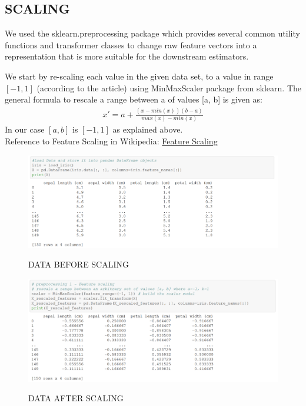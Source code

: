 \documentclass{article}
\begin{document}
\subsection{SCALING}
We used the sklearn.preprocessing package which provides several common utility functions and transformer classes to change raw feature vectors into a representation that is more suitable for the downstream estimators.\\
\par
We start by re-scaling each value in the given data set, to a value in range \([-1,1]\) (according to the article) using MinMaxScaler package from sklearn.
The general formula to rescale a range between a of values [a, b] is given as:
\begin{equation}
\begin{split}
x' = a + \frac{(x-min(x))(b-a)}{max(x)-min(x)} 
\end{split}
\end{equation}
In our case \([a,b]\) is \([-1,1]\) as explained above.\\
Reference to Feature Scaling in Wikipedia: \href{https://en.wikipedia.org/wiki/Feature_scaling}{Feature Scaling}

\par

\begin{figure}[H]
\caption{DATA BEFORE SCALING }
\includegraphics[width=6.8in]{1.png}
\label{fig:label}
\end{figure} 

\begin{figure}[H]
\caption{DATA AFTER SCALING }
\includegraphics[width=6.8in]{2.png}
\label{fig:label}
\end{figure} 
\end{document}
